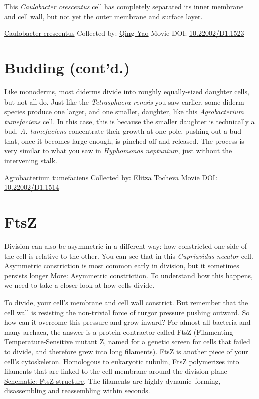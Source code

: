 \documentclass[]{tufte-book}
\begin{document}
This \emph{Caulobacter crescentus} cell has completely separated its inner membrane and cell wall, but not yet the outer membrane and surface layer.



\hypertarget{htmlwidget-659afd0b31dc40bd73c9}{}

\label{fig:5-7a}\protect\hyperlink{tree}{Caulobacter crescentus} Collected by: \protect\hyperlink{qing_yao}{Qing Yao} Movie DOI: \href{https://doi.org/10.22002/D1.1523}{10.22002/D1.1523}

\hypertarget{budding-contd.}{%
\section{Budding (cont'd.)}\label{budding-contd.}}

Like monoderms, most diderms divide into roughly equally-sized daughter cells, but not all do. Just like the \emph{Tetrasphaera remsis} you saw earlier, some diderm species produce one larger, and one smaller, daughter, like this \emph{Agrobacterium tumefaciens} cell. In this case, this is because the smaller daughter is technically a bud. \emph{A. tumefaciens} concentrate their growth at one pole, pushing out a bud that, once it becomes large enough, is pinched off and released. The process is very similar to what you saw in \emph{Hyphomonas neptunium}, just without the intervening stalk.



\hypertarget{htmlwidget-4a29a7b9db86194b29c5}{}

\label{fig:5-8}\protect\hyperlink{tree}{Agrobacterium tumefaciens} Collected by: \protect\hyperlink{elitza_tocheva}{Elitza Tocheva} Movie DOI: \href{https://doi.org/10.22002/D1.1514}{10.22002/D1.1514}

\hypertarget{ftsz}{%
\section{FtsZ}\label{ftsz}}

Division can also be asymmetric in a different way: how constricted one side of the cell is relative to the other. You can see that in this \emph{Cupriavidus necator} cell. Asymmetric constriction is most common early in division, but it sometimes persists longer \protect\hyperlink{Asymmetric_constriction}{More: Asymmetric constriction}. To understand how this happens, we need to take a closer look at how cells divide.

To divide, your cell's membrane and cell wall constrict. But remember that the cell wall is resisting the non-trivial force of turgor pressure pushing outward. So how can it overcome this pressure and grow inward? For almost all bacteria and many archaea, the answer is a protein contractor called FtsZ (Filamenting Temperature-Sensitive mutant Z, named for a genetic screen for cells that failed to divide, and therefore grew into long filaments). FtsZ is another piece of your cell's cytoskeleton. Homologous to eukaryotic tubulin, FtsZ polymerizes into filaments that are linked to the cell membrane around the division plane \protect\hyperlink{FtsZ_structure}{Schematic: FtsZ structure}. The filaments are highly dynamic--forming, disassembling and reassembling within seconds.
\end{document}
